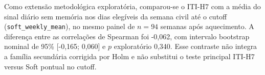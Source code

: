 Como extensão metodológica exploratória, comparou-se o ITI-H7 com a média do sinal diário sem memória nos dias elegíveis da semana civil até o cutoff (\texttt{soft\_weekly\_mean}), no mesmo painel de $n=94$ semanas após aquecimento. A diferença entre as correlações de Spearman foi -0,062, com intervalo bootstrap nominal de 95\% [-0,165; 0,060] e $p$ exploratório 0,340. Esse contraste não integra a família secundária corrigida por Holm e não substitui o teste principal ITI-H7 versus Soft pontual no cutoff.
